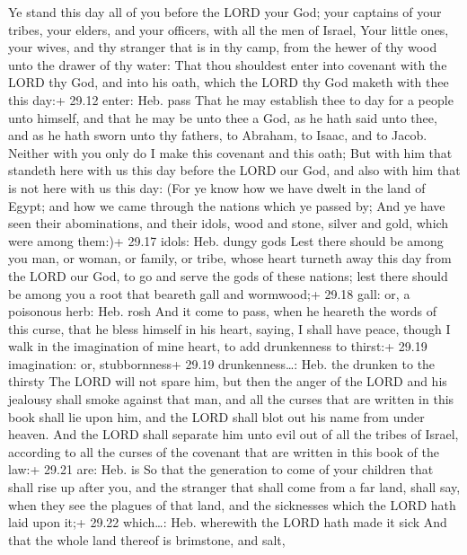  Ye stand this day all of you before the LORD your God;
your captains of your tribes, your elders, and your officers, with all
the men of Israel,  Your little ones, your wives, and thy
stranger that is in thy camp, from the hewer of thy wood unto the drawer
of thy water:  That thou shouldest enter into covenant with
the LORD thy God, and into his oath, which the LORD thy God maketh with
thee this day:+ 29.12 enter: Heb. pass  That he may
establish thee to day for a people unto himself, and that he may be unto
thee a God, as he hath said unto thee, and as he hath sworn unto thy
fathers, to Abraham, to Isaac, and to Jacob.  Neither with
you only do I make this covenant and this oath;  But with
him that standeth here with us this day before the LORD our God, and
also with him that is not here with us this day:  (For ye
know how we have dwelt in the land of Egypt; and how we came through the
nations which ye passed by;  And ye have seen their
abominations, and their idols, wood and stone, silver and gold, which
were among them:)+ 29.17 idols: Heb. dungy gods  Lest there
should be among you man, or woman, or family, or tribe, whose heart
turneth away this day from the LORD our God, to go and serve the gods of
these nations; lest there should be among you a root that beareth gall
and wormwood;+ 29.18 gall: or, a poisonous herb: Heb. rosh 
And it come to pass, when he heareth the words of this curse, that he
bless himself in his heart, saying, I shall have peace, though I walk in
the imagination of mine heart, to add drunkenness to thirst:+ 29.19
imagination: or, stubbornness+ 29.19 drunkenness\ldots: Heb. the drunken
to the thirsty  The LORD will not spare him, but then the
anger of the LORD and his jealousy shall smoke against that man, and all
the curses that are written in this book shall lie upon him, and the
LORD shall blot out his name from under heaven.  And the
LORD shall separate him unto evil out of all the tribes of Israel,
according to all the curses of the covenant that are written in this
book of the law:+ 29.21 are: Heb. is  So that the
generation to come of your children that shall rise up after you, and
the stranger that shall come from a far land, shall say, when they see
the plagues of that land, and the sicknesses which the LORD hath laid
upon it;+ 29.22 which\ldots: Heb. wherewith the LORD hath made it sick
 And that the whole land thereof is brimstone, and salt,
